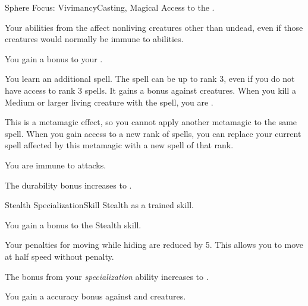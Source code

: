   \begin{magicalfeat}{Sphere Focus: Vivimancy}{Casting, Magical}
    \featpre Access to the  .

     Your \atLife abilities from the   affect nonliving creatures other than undead, even if those creatures would normally be immune to \atLife abilities.

     You gain a  bonus to your .

     You learn an additional spell.
    The spell can be up to rank 3, even if you do not have access to rank 3 spells.
    It gains a   bonus against  creatures.
    When you kill a Medium or larger living creature with the spell, you are \briefly \empowered.

    This is a metamagic effect, so you cannot apply another metamagic to the same spell.
    When you gain access to a new rank of spells, you can replace your current spell affected by this metamagic with a new spell of that rank.

     You are immune to \atLife attacks.

     The durability bonus increases to .
  \end{magicalfeat}

  \begin{feat}{Stealth Specialization}{Skill}
    \featpre Stealth as a trained skill.

     You gain a  bonus to the Stealth skill.

     Your penalties for moving while hiding are reduced by 5.
    This allows you to move at half speed without penalty.

     The bonus from your \textit{specialization} ability increases to .

     You gain a  accuracy bonus against \unaware and \partiallyunaware creatures.
  \end{feat}

